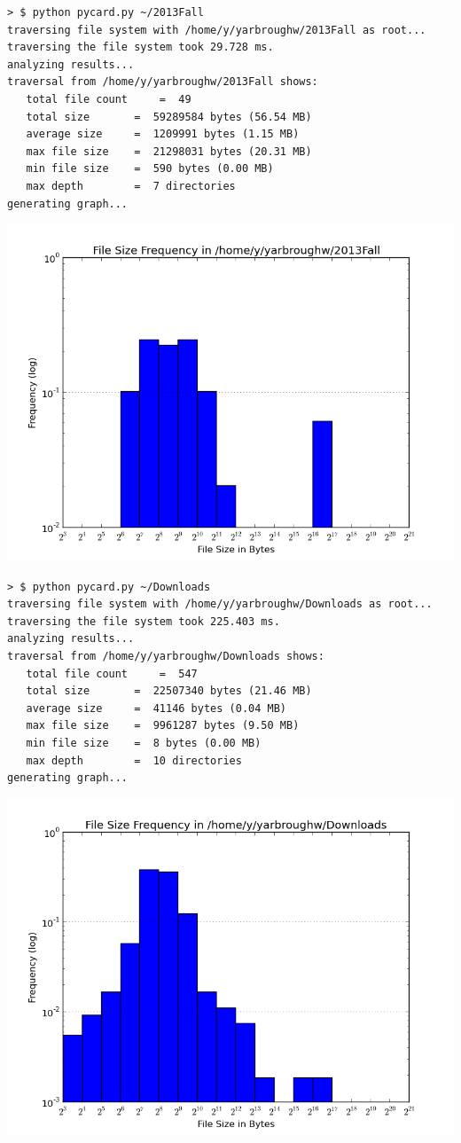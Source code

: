 \begin{lstlisting}
> $ python pycard.py ~/2013Fall
traversing file system with /home/y/yarbroughw/2013Fall as root...
traversing the file system took 29.728 ms.
analyzing results...
traversal from /home/y/yarbroughw/2013Fall shows:
   total file count 	=  49
   total size 		=  59289584 bytes (56.54 MB)
   average size 	=  1209991 bytes (1.15 MB)
   max file size 	=  21298031 bytes (20.31 MB)
   min file size 	=  590 bytes (0.00 MB)
   max depth 		=  7 directories
generating graph...
\end{lstlisting}

\includegraphics[scale=0.7]{assets/pycard-graph-2.png}

\newpage

\begin{lstlisting}
> $ python pycard.py ~/Downloads
traversing file system with /home/y/yarbroughw/Downloads as root...
traversing the file system took 225.403 ms.
analyzing results...
traversal from /home/y/yarbroughw/Downloads shows:
   total file count 	=  547
   total size 		=  22507340 bytes (21.46 MB)
   average size 	=  41146 bytes (0.04 MB)
   max file size 	=  9961287 bytes (9.50 MB)
   min file size 	=  8 bytes (0.00 MB)
   max depth 		=  10 directories
generating graph...
\end{lstlisting}

\includegraphics[scale=0.7]{assets/pycard-graph-3.png}


